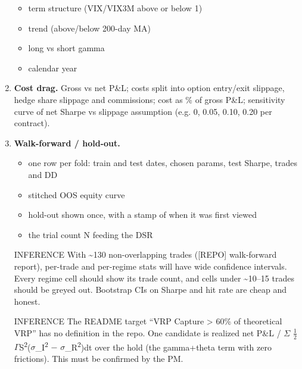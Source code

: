 \documentclass{article}
\begin{document}
\begin{enumerate}
\begin{itemize}
\item term structure (VIX/\allowbreak{}VIX3M above or below 1)

\item trend (above/\allowbreak{}below 200-day MA)

\item long vs short gamma

\item calendar year

\end{itemize}

\item \textbf{Cost drag.} Gross vs net P\&L; costs split into option entry/\allowbreak{}exit slippage, hedge share slippage and commissions; cost as \% of gross P\&L; sensitivity curve of net Sharpe vs slippage assumption (e.g. 0, 0.05, 0.10, 0.20 per contract).

\item \textbf{Walk-forward /\allowbreak{} hold-out.}

\begin{itemize}

\item one row per fold: train and test dates, chosen params, test Sharpe, trades and DD

\item stitched OOS equity curve

\item hold-out shown once, with a stamp of when it was first viewed

\item the trial count N feeding the DSR

\end{itemize}

\end{enumerate}

\begin{itemize}

\item [INFERENCE] With \textasciitilde{}130 non-overlapping trades ([REPO] walk-forward report), per-trade and per-regime stats will have wide confidence intervals. Every regime cell should show its trade count, and cells under \textasciitilde{}10--15 trades should be greyed out. Bootstrap CIs on Sharpe and hit rate are cheap and honest.

\item [INFERENCE] The README target ``VRP Capture > 60\% of theoretical VRP'' has no definition in the repo. One candidate is realized net P\&L /\allowbreak{} \ensuremath{\Sigma} \ensuremath{\frac12}\ensuremath{\Gamma}S\textsuperscript{2}(\ensuremath{\sigma}\_I\textsuperscript{2} \ensuremath{-} \ensuremath{\sigma}\_R\textsuperscript{2})dt over the hold (the gamma+theta term with zero frictions). This must be confirmed by the PM.

\end{itemize}
\end{document}
